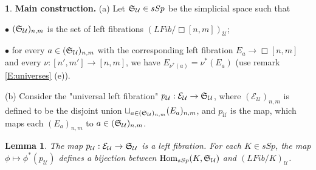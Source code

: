 \documentclass[12pt]{amsart}
\theoremstyle{plain}
\newtheorem{Lem}[Thm]{Lemma}
\theoremstyle{definition}
\newtheorem{Emp}[Thm]{}
\numberwithin{equation}{section}
\newcommand{\cal}[1]{\mathcal{#1}}
\newcommand{\C}[1]{\cal#1}
\newcommand{\Dt}{\Delta}
\newcommand{\al}{\alpha}
\newcommand{\re}[1]{\ref{E:#1}}
\newcommand{\Hom}{\operatorname{Hom}}
\renewcommand{\S}{\frak{S}}
\begin{document}



\begin{Emp} \label{E:leftfibr}
{\bf Main construction.} (a) Let $\S_{\C{U}}\in sSp$ be the
simplicial space such that

\noindent $\bullet$ $(\S_{\C{U}})_{n,m}$ is the set of left
fibrations $(LFib/\Box[n,m])_{\C{U}}$;

\noindent $\bullet$ for every $a\in (\S_{\C{U}})_{n,m}$ with the
corresponding left fibration $E_{a}\to\Box[n,m]$ and every
$\nu:[n',m']\to[n,m]$, we have $E_{\nu^*(a)}=\nu^*(E_a)$ (use
remark \re{universes} (e)).

(b) Consider the "universal left fibration"
$p_{\C{U}}:\C{E}_{\C{U}}\to \S_{\C{U}}$, where
$(\C{E}_{\C{U}})_{n,m}$ is defined to be the disjoint union
$\sqcup_{a\in (\S_{\C{U}})_{n,m}} (E_{a})_{n,m}$, and $p_{\C{U}}$ 
is the map, which maps each $(E_a)_{n,m}$ to $a\in
(\S_{\C{U}})_{n,m}$.
\end{Emp}

\begin{Lem} \label{L:univ}
The map $p_{\C{U}}:\C{E}_{\C{U}}\to \S_{\C{U}}$ is a left
fibration. For each $K\in sSp$, the map $\phi\mapsto
\phi^*(p_{\C{U}})$ defines a bijection between
$\Hom_{sSp}(K,\S_{\C{U}})$ and $(LFib/K)_{\C{U}}$.
\end{Lem}
\end{document}
